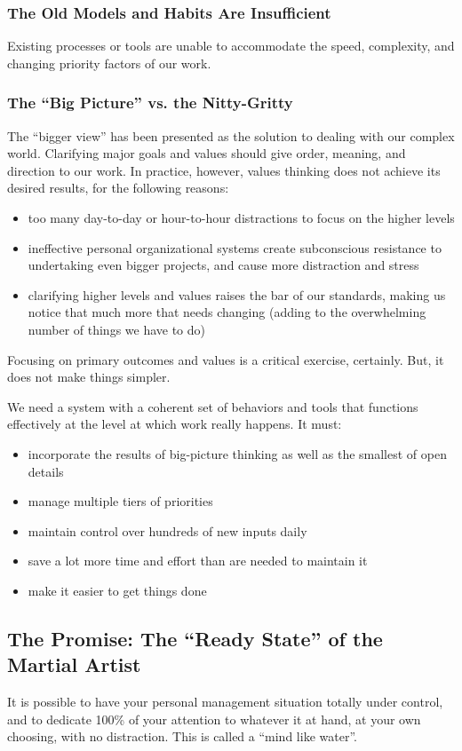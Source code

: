 \documentclass[letterpaper]{article}
\newcommand{\p}{\vspace{1em}\par}		%
\begin{document}
\subsubsection*{The Old Models and Habits Are Insufficient}
Existing processes or tools are unable to accommodate the speed, complexity, and changing priority factors of our work.

\subsubsection*{The ``Big Picture'' vs. the Nitty-Gritty}
The ``bigger view'' has been presented as the solution to dealing with our complex world. Clarifying major goals and values should give order, meaning, and direction to our work. In practice, however, values thinking does not achieve its desired results, for the following reasons:
\begin{itemize}
\item too many day-to-day or hour-to-hour distractions to focus on the higher levels
\item ineffective personal organizational systems create subconscious resistance to undertaking even bigger projects, and cause more distraction and stress
\item clarifying higher levels and values raises the bar of our standards, making us notice that much more that needs changing (adding to the overwhelming number of things we have to do)
\end{itemize}
Focusing on primary outcomes and values is a critical exercise, certainly. But, it does not make things simpler. 

\p We need a system with a coherent set of behaviors and tools that functions effectively at the level at which work really happens. It must:
\begin{itemize}
\item incorporate the results of big-picture thinking as well as the smallest of open details
\item manage multiple tiers of priorities
\item maintain control over hundreds of new inputs daily
\item save a lot more time and effort than are needed to maintain it
\item make it easier to get things done
\end{itemize}

\subsection{The Promise: The ``Ready State'' of the Martial Artist}
It is possible to have your personal management situation totally under control, and to dedicate 100\% of your attention to whatever it at hand, at your own choosing, with no distraction. This is called a ``mind like water''.
\end{document}
